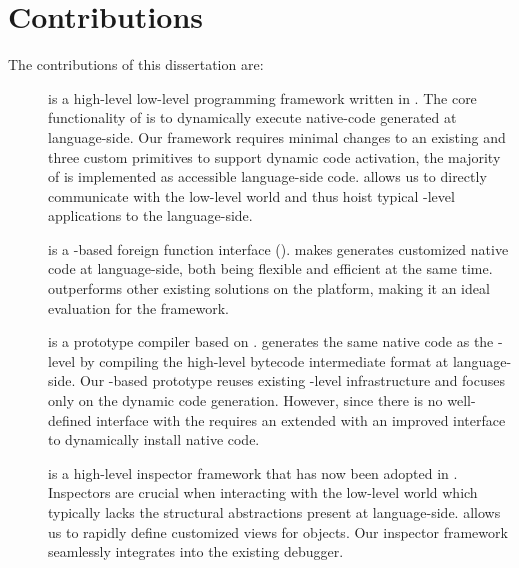 \section{Contributions}

The contributions of this dissertation are:
\begin{description}
	\item[\B] is a high-level low-level programming framework written in .
	The core functionality of \B is to dynamically execute native-code generated at language-side.
	Our framework requires minimal changes to an existing \VM and three custom primitives to support dynamic code activation, the majority of \B is implemented as accessible language-side code.
	\B allows us to directly communicate with the low-level world and thus hoist typical \VM-level applications to the language-side.
		
	\item[\NB] is a \B-based foreign function interface (\FFI).
	\NB makes generates customized native code at language-side, both being flexible and efficient at the same time.
	\NB outperforms other existing \FFI solutions on the \PH platform, making it an ideal evaluation for the \B framework.
	
	\item[\NBJ] is a prototype \JIT compiler based on \B.
	\NBJ generates the same native code as the \VM-level \JIT by compiling the high-level bytecode intermediate format at language-side.
	Our \B-based \JIT prototype reuses existing \VM-level infrastructure and focuses only on the dynamic code generation.
	However, since there is no well-defined interface with the \VM \NBJ requires an extended \VM with an improved \JIT interface to dynamically install native code.
	
	\item[] 	
	
	\item[\Eye] is a high-level inspector framework that has now been adopted in \PH.
	Inspectors are crucial when interacting with the low-level world which typically lacks the structural abstractions present at language-side.
	\Eye allows us to rapidly define customized views for \PH objects.
	Our inspector framework seamlessly integrates into the existing \PH debugger.
		
\end{description}


